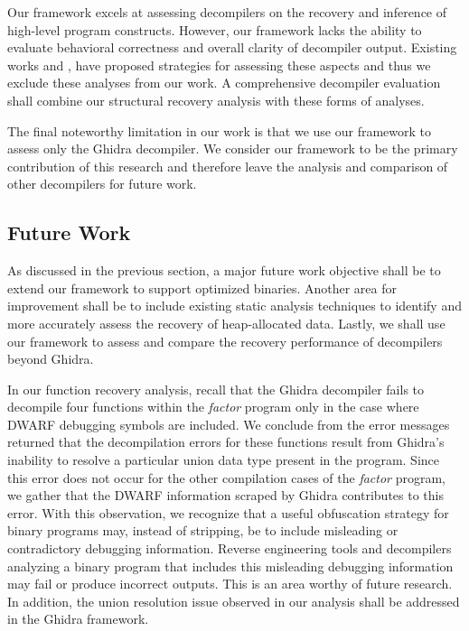 \documentclass[a4paper,twoside]{article}
\begin{document}
Our framework excels at assessing decompilers on the recovery and inference of high-level program constructs. However, our framework lacks the ability to evaluate behavioral correctness and overall clarity of decompiler output. Existing works \cite{bib:how-far-weve-come} and \cite{bib:metrics-effectiveness-decompilers}, have proposed strategies for assessing these aspects and thus we exclude these analyses from our work. A comprehensive decompiler evaluation shall combine our structural recovery analysis with these forms of analyses.

The final noteworthy limitation in our work is that we use our framework to assess only the Ghidra decompiler. We consider our framework to be the primary contribution of this research and therefore leave the analysis and comparison of other decompilers for future work.

\subsection{Future Work}

As discussed in the previous section, a major future work objective shall be to extend our framework to support optimized binaries. Another area for improvement shall be to include existing static analysis techniques to identify and more accurately assess the recovery of heap-allocated data. Lastly, we shall use our framework to assess and compare the recovery performance of decompilers beyond Ghidra.

In our function recovery analysis, recall that the Ghidra decompiler fails to decompile four functions within the \emph{factor} program only in the case where DWARF debugging symbols are included. We conclude from the error messages returned that the decompilation errors for these functions result from Ghidra's inability to resolve a particular union data type present in the program. Since this error does not occur for the other compilation cases of the \emph{factor} program, we gather that the DWARF information scraped by Ghidra contributes to this error. With this observation, we recognize that a useful obfuscation strategy for binary programs may, instead of stripping, be to include misleading or contradictory debugging information. Reverse engineering tools and decompilers analyzing a binary program that includes this misleading debugging information may fail or produce incorrect outputs. This is an area worthy of future research. In addition, the union resolution issue observed in our analysis shall be addressed in the Ghidra framework.
\end{document}
